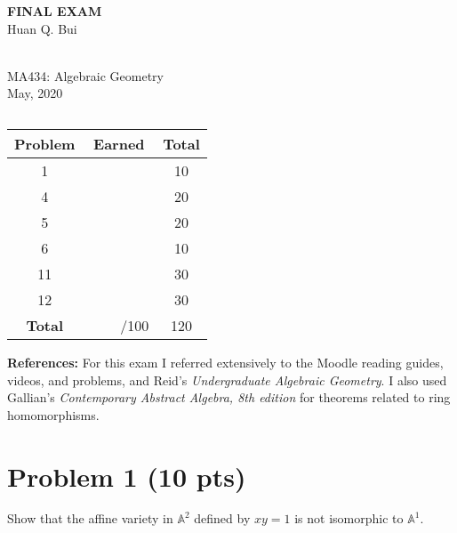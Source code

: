 \documentclass[12pt]{article}
\newcommand{\A}{\mathbb{A}}
\begin{document}
\begin{center}
	\LARGE{\textbf{FINAL EXAM}}
	\\
	\large{Huan Q. Bui}
	
	\noindent \hrulefill\\
	\small{MA434: Algebraic Geometry}\\
	\small{May, 2020}\\\vspace{-6pt}
	\hrulefill
\end{center}

 

$\,$\\
$\,$\\


\begin{center}
\begin{tabular}{|c|c|c|}
	\hline
	Problem & Earned & Total\\
	\hline
	1&&10\\
	\hline
	4&&20\\
	\hline
	5&&20\\
	\hline
	6&&10\\
	\hline
	11&&30\\
	\hline
	12&&30\\
	\hline
	\textbf{Total}&$\,\quad\quad$/100&120\\
	\hline
\end{tabular}
\end{center}



\noindent \textbf{References:} For this exam I referred extensively to the Moodle reading guides, videos, and problems, and Reid's \textit{Undergraduate Algebraic Geometry}. I also used Gallian's \textit{Contemporary Abstract Algebra, 8th edition} for theorems related to ring homomorphisms. 

\newpage



%
%
%
%




\section*{Problem 1 \small{(10 pts)}}
Show that the affine variety in $\A^2$ defined by $xy=1$ is not isomorphic to $\A^1$. \\
\end{document}
